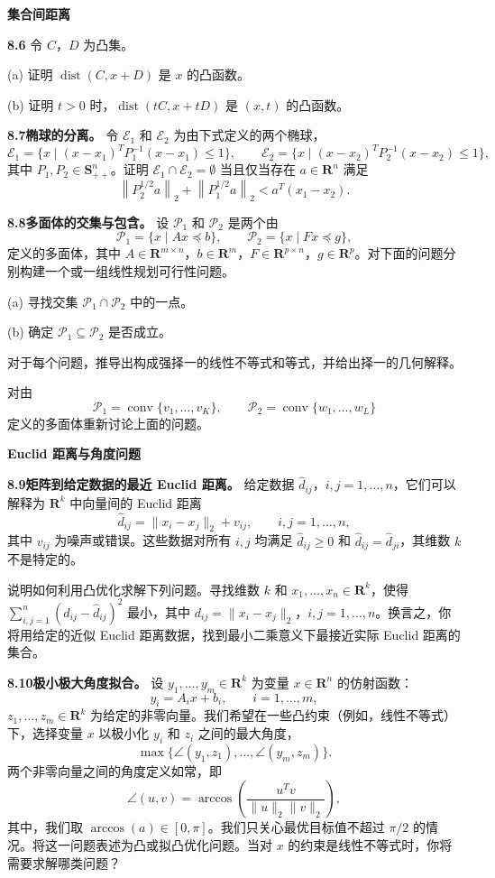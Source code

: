 \documentclass[UTF8,12pt,a4paper,fontset=fandol]{ctexart}
\begin{document}
\noindent\textbf{集合间距离}

\noindent\textbf{8.6}
令 $C$，$D$ 为凸集。

(a) 证明 $\operatorname{dist}(C,x+D)$ 是 $x$ 的凸函数。

(b) 证明 $t>0$ 时，$\operatorname{dist}(tC,x+tD)$ 是 $(x,t)$ 的凸函数。

\noindent\textbf{8.7\quad 椭球的分离。}
令 $\mathcal E_1$ 和 $\mathcal E_2$ 为由下式定义的两个椭球，
\[
\mathcal E_1=\{x\mid (x-x_1)^TP_1^{-1}(x-x_1)\leq 1\},\qquad
\mathcal E_2=\{x\mid (x-x_2)^TP_2^{-1}(x-x_2)\leq 1\},
\]
其中 $P_1,P_2\in\mathbf{S}_{++}^n$。证明 $\mathcal E_1\cap\mathcal E_2=\emptyset$ 当且仅当存在 $a\in\mathbf{R}^n$ 满足
\[
\left\|P_2^{1/2}a\right\|_2+\left\|P_1^{1/2}a\right\|_2<a^T(x_1-x_2).
\]

\noindent\textbf{8.8\quad 多面体的交集与包含。}
设 $\mathcal P_1$ 和 $\mathcal P_2$ 是两个由
\[
\mathcal P_1=\{x\mid Ax\preceq b\},\qquad \mathcal P_2=\{x\mid Fx\preceq g\},
\]
定义的多面体，其中 $A\in\mathbf{R}^{m\times n}$，$b\in\mathbf{R}^m$，$F\in\mathbf{R}^{p\times n}$，$g\in\mathbf{R}^p$。对下面的问题分别构建一个或一组线性规划可行性问题。

(a) 寻找交集 $\mathcal P_1\cap\mathcal P_2$ 中的一点。

(b) 确定 $\mathcal P_1\subseteq\mathcal P_2$ 是否成立。

对于每个问题，推导出构成强择一的线性不等式和等式，并给出择一的几何解释。

对由
\[
\mathcal P_1=\operatorname{conv}\{v_1,\ldots,v_K\},\qquad
\mathcal P_2=\operatorname{conv}\{w_1,\ldots,w_L\}
\]
定义的多面体重新讨论上面的问题。

\noindent\textbf{Euclid 距离与角度问题}

\noindent\textbf{8.9\quad 矩阵到给定数据的最近 Euclid 距离。}
给定数据 $\hat d_{ij}$，$i,j=1,\ldots,n$，它们可以解释为 $\mathbf{R}^k$ 中向量间的 Euclid 距离
\[
\hat d_{ij}=\|x_i-x_j\|_2+v_{ij},\qquad i,j=1,\ldots,n,
\]
其中 $v_{ij}$ 为噪声或错误。这些数据对所有 $i,j$ 均满足 $\hat d_{ij}\geq 0$ 和 $\hat d_{ij}=\hat d_{ji}$，其维数 $k$ 不是特定的。

说明如何利用凸优化求解下列问题。寻找维数 $k$ 和 $x_1,\ldots,x_n\in\mathbf{R}^k$，使得 $\sum_{i,j=1}^n(d_{ij}-\hat d_{ij})^2$ 最小，其中 $d_{ij}=\|x_i-x_j\|_2$，$i,j=1,\ldots,n$。换言之，你将用给定的近似 Euclid 距离数据，找到最小二乘意义下最接近实际 Euclid 距离的集合。

\noindent\textbf{8.10\quad 极小极大角度拟合。}
设 $y_1,\ldots,y_m\in\mathbf{R}^k$ 为变量 $x\in\mathbf{R}^n$ 的仿射函数：
\[
y_i=A_ix+b_i,\qquad i=1,\ldots,m,
\]
$z_1,\ldots,z_m\in\mathbf{R}^k$ 为给定的非零向量。我们希望在一些凸约束（例如，线性不等式）下，选择变量 $x$ 以极小化 $y_i$ 和 $z_i$ 之间的最大角度，
\[
\max\{\angle(y_1,z_1),\ldots,\angle(y_m,z_m)\}.
\]
两个非零向量之间的角度定义如常，即
\[
\angle(u,v)=\arccos\left(\frac{u^Tv}{\|u\|_2\|v\|_2}\right),
\]
其中，我们取 $\arccos(a)\in[0,\pi]$。我们只关心最优目标值不超过 $\pi/2$ 的情况。将这一问题表述为凸或拟凸优化问题。当对 $x$ 的约束是线性不等式时，你将需要求解哪类问题？
\end{document}
